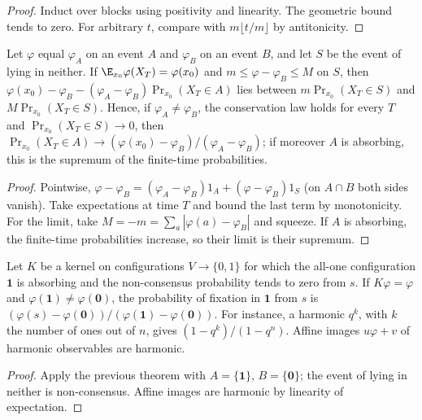 \begin{proof}\leanok
Induct over blocks using positivity and linearity. The geometric bound tends
to zero. For arbitrary $t$, compare with $m\lfloor t/m\rfloor$ by antitonicity.
\end{proof}
\begin{theorem}\label{thm:optional-stopping}
\leanok{}
Let $\varphi$ equal $\varphi_A$ on an event $A$ and $\varphi_B$ on an event $B$, and let
$S$ be the event of lying in neither. If $\E_{x_0}\varphi(X_T)=\varphi(x_0)$ and
$m\le\varphi-\varphi_B\le M$ on $S$, then
$\varphi(x_0)-\varphi_B-(\varphi_A-\varphi_B)\Pr_{x_0}(X_T\in A)$ lies between
$m\Pr_{x_0}(X_T\in S)$ and $M\Pr_{x_0}(X_T\in S)$. Hence, if $\varphi_A\ne\varphi_B$,
the conservation law holds for every $T$ and $\Pr_{x_0}(X_T\in S)\to0$, then
$\Pr_{x_0}(X_T\in A)\to(\varphi(x_0)-\varphi_B)/(\varphi_A-\varphi_B)$; if moreover $A$
is absorbing, this is the supremum of the finite-time probabilities.
\end{theorem}
\begin{proof}\leanok
Pointwise, $\varphi-\varphi_B=(\varphi_A-\varphi_B)1_A+(\varphi-\varphi_B)1_S$ (on
$A\cap B$ both sides vanish). Take expectations at time $T$ and bound the last term by
monotonicity. For the limit, take $M=-m=\sum_a|\varphi(a)-\varphi_B|$ and squeeze. If $A$
is absorbing, the finite-time probabilities increase, so their limit is their supremum.
\end{proof}
\begin{lemma}\label{lem:gamblers-ruin}
\leanok{}
Let $K$ be a kernel on configurations $V\to\{0,1\}$ for which the all-one configuration
$\mathbf 1$ is absorbing and the non-consensus probability tends to zero from $s$. If
$K\varphi=\varphi$ and $\varphi(\mathbf 1)\ne\varphi(\mathbf 0)$, the probability of fixation
in $\mathbf 1$ from $s$ is $(\varphi(s)-\varphi(\mathbf 0))/(\varphi(\mathbf 1)-\varphi(\mathbf 0))$.
For instance, a harmonic $q^{k}$, with $k$ the number of ones out of $n$, gives
$(1-q^k)/(1-q^n)$. Affine images $u\varphi+v$ of harmonic observables are harmonic.
\end{lemma}
\begin{proof}\leanok
Apply the previous theorem with $A=\{\mathbf 1\}$, $B=\{\mathbf 0\}$; the event of lying in
neither is non-consensus. Affine images are harmonic by linearity of expectation.
\end{proof}

